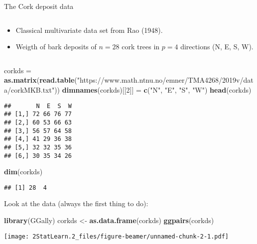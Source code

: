 \documentclass[ignorenonframetext,]{beamer}
\newenvironment{Shaded}{\begin{snugshade}}{\end{snugshade}}
\newcommand{\DecValTok}[1]{\textcolor[rgb]{0.00,0.00,0.81}{#1}}
\newcommand{\KeywordTok}[1]{\textcolor[rgb]{0.13,0.29,0.53}{\textbf{#1}}}
\newcommand{\NormalTok}[1]{#1}
\newcommand{\StringTok}[1]{\textcolor[rgb]{0.31,0.60,0.02}{#1}}
\providecommand{\tightlist}{%
  \setlength{\itemsep}{0pt}\setlength{\parskip}{0pt}}
\begin{document}
\begin{frame}[fragile]

\begin{block}{The Cork deposit data}

\(~\)

\begin{itemize}
\tightlist
\item
  Classical multivariate data set from Rao (1948).
\item
  Weigth of bark deposits of \(n=28\) cork trees in \(p=4\) directions
  (N, E, S, W).
\end{itemize}

\(~\)

\tiny

\begin{Shaded}
\begin{Highlighting}[]
\NormalTok{corkds =}\StringTok{ }\KeywordTok{as.matrix}\NormalTok{(}\KeywordTok{read.table}\NormalTok{(}\StringTok{"https://www.math.ntnu.no/emner/TMA4268/2019v/data/corkMKB.txt"}\NormalTok{))}
\KeywordTok{dimnames}\NormalTok{(corkds)[[}\DecValTok{2}\NormalTok{]] =}\StringTok{ }\KeywordTok{c}\NormalTok{(}\StringTok{"N"}\NormalTok{, }\StringTok{"E"}\NormalTok{, }\StringTok{"S"}\NormalTok{, }\StringTok{"W"}\NormalTok{)}
\KeywordTok{head}\NormalTok{(corkds)}
\end{Highlighting}
\end{Shaded}

\begin{verbatim}
##       N  E  S  W
## [1,] 72 66 76 77
## [2,] 60 53 66 63
## [3,] 56 57 64 58
## [4,] 41 29 36 38
## [5,] 32 32 35 36
## [6,] 30 35 34 26
\end{verbatim}

\begin{Shaded}
\begin{Highlighting}[]
\KeywordTok{dim}\NormalTok{(corkds)}
\end{Highlighting}
\end{Shaded}

\begin{verbatim}
## [1] 28  4
\end{verbatim}

\end{block}

\end{frame}

\begin{frame}[fragile]

Look at the data (always the first thing to do):

\tiny

\begin{Shaded}
\begin{Highlighting}[]
\KeywordTok{library}\NormalTok{(GGally)}
\NormalTok{corkds <-}\StringTok{ }\KeywordTok{as.data.frame}\NormalTok{(corkds)}
\KeywordTok{ggpairs}\NormalTok{(corkds)}
\end{Highlighting}
\end{Shaded}

\texttt{[image: 2StatLearn.2\_files/figure-beamer/unnamed-chunk-2-1.pdf]}

\end{frame}
\end{document}
